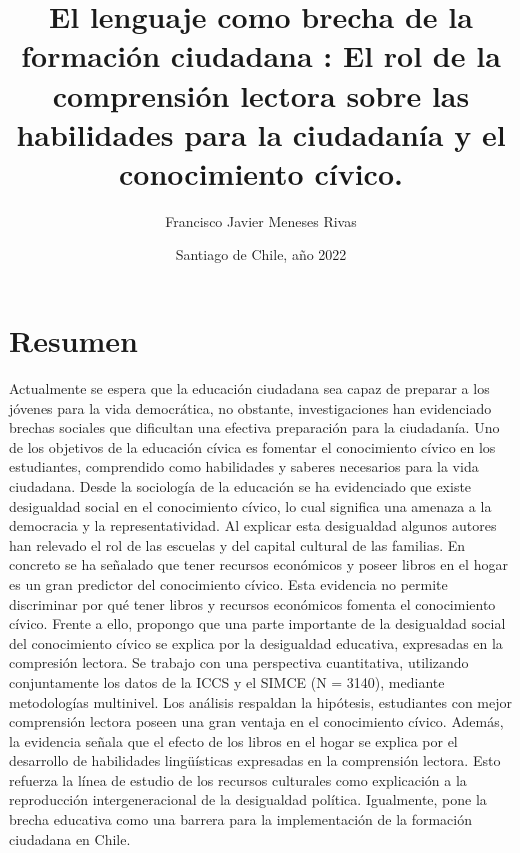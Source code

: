 \documentclass[12pt,twoside]{templates/facsothesis}
\title{{ El lenguaje como brecha de la formación ciudadana }: El rol de la comprensión lectora sobre las habilidades para la ciudadanía y el conocimiento cívico.}
\author{Francisco Javier Meneses Rivas}
\date{Santiago de Chile, año 2022}
\begin{document}

  \maketitle

\frontmatter %
\pagestyle{empty} %



  \setcounter{tocdepth}{1}
  \setlength{\parskip}{0pt}
  \tableofcontents

\setlength\parskip{1em plus 0.1em minus 0.2em}

  \listoftables

  \listoffigures



\mainmatter %
\pagestyle{fancyplain} %

\hypertarget{resumen}{%
\chapter*{Resumen}\label{resumen}}

Actualmente se espera que la educación ciudadana sea capaz de preparar a los jóvenes para la vida democrática, no obstante, investigaciones han evidenciado brechas sociales que dificultan una efectiva preparación para la ciudadanía. Uno de los objetivos de la educación cívica es fomentar el conocimiento cívico en los estudiantes, comprendido como habilidades y saberes necesarios para la vida ciudadana. Desde la sociología de la educación se ha evidenciado que existe desigualdad social en el conocimiento cívico, lo cual significa una amenaza a la democracia y la representatividad. Al explicar esta desigualdad algunos autores han relevado el rol de las escuelas y del capital cultural de las familias. En concreto se ha señalado que tener recursos económicos y poseer libros en el hogar es un gran predictor del conocimiento cívico. Esta evidencia no permite discriminar por qué tener libros y recursos económicos fomenta el conocimiento cívico. Frente a ello, propongo que una parte importante de la desigualdad social del conocimiento cívico se explica por la desigualdad educativa, expresadas en la compresión lectora. Se trabajo con una perspectiva cuantitativa, utilizando conjuntamente los datos de la ICCS y el SIMCE (N = 3140), mediante metodologías multinivel. Los análisis respaldan la hipótesis, estudiantes con mejor comprensión lectora poseen una gran ventaja en el conocimiento cívico. Además, la evidencia señala que el efecto de los libros en el hogar se explica por el desarrollo de habilidades lingüísticas expresadas en la comprensión lectora. Esto refuerza la línea de estudio de los recursos culturales como explicación a la reproducción intergeneracional de la desigualdad política. Igualmente, pone la brecha educativa como una barrera para la implementación de la formación ciudadana en Chile.
\end{document}
